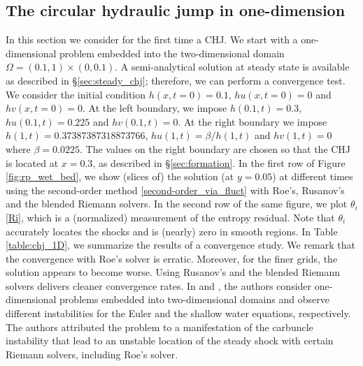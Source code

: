 \documentclass[preprint, 11pt]{article}
\begin{document}
\subsection{The circular hydraulic jump in one-dimension}\label{sec:1D_chj}
In this section we consider for the first time a CHJ. We start with a one-dimensional problem
embedded into the two-dimensional domain $\Omega=(0.1,1)\times(0,0.1)$.
A semi-analytical solution at steady state is available as described in \S \ref{sec:steady_chj};
therefore, we can perform a convergence test.
We consider the initial condition $h(x,t=0)=0.1$, $hu(x,t=0)=0$ and $hv(x,t=0)=0$.
At the left boundary, we impose $h(0.1,t)=0.3$, $hu(0.1,t)=0.225$ and $hv(0.1,t)=0$.
At the right boundary we impose $h(1,t)=0.37387387318873766$, $hu(1,t)=\beta/h(1,t)$ and $hv(1,t)=0$ where $\beta=0.0225$.
The values on the right boundary are chosen so that the CHJ is located at $x=0.3$, as described in \S \ref{sec:formation}.
%
In the first row of Figure \ref{fig:rp_wet_bed}, we show (slices of) the solution (at $y=0.05$)
at different times using the second-order method \eqref{second-order_via_fluct} with Roe's, Rusanov's and the blended Riemann solvers.
In the second row of the same figure, we plot $\theta_i$ \eqref{Ri}, which is a (normalized) measurement of the
entropy residual. Note that $\theta_i$ accurately locates the shocks and is (nearly) zero in smooth regions.
In Table \ref{table:chj_1D}, we summarize the results of a convergence study.
We remark that the convergence with Roe's solver is erratic.
Moreover, for the finer grids, the solution appears to become worse.
Using Rusanov's and the blended Riemann solvers delivers cleaner convergence rates.
In \cite[\S 5]{kemm2018heuristical} and \cite{bader2014carbuncle}, the authors consider one-dimensional problems embedded into
two-dimensional domains and observe different instabilities for the
Euler and the shallow water equations, respectively.
The authors attributed the problem to a manifestation of the carbuncle instability
that lead to an unstable location of the steady shock with certain Riemann solvers, including Roe's solver.
\end{document}
